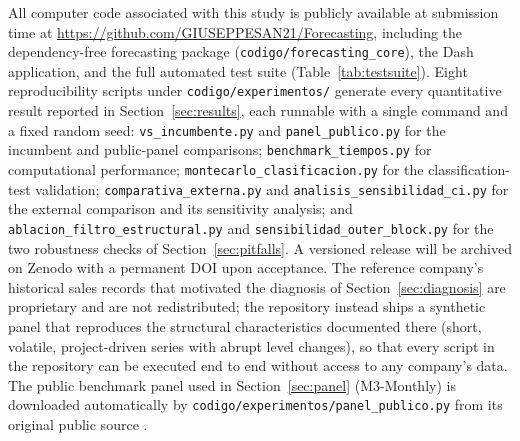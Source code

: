 \documentclass[forecasting,article,submit,pdftex,moreauthors]{Definitions/mdpi}
\begin{document}
All computer code associated with this study is publicly available at submission time at \url{https://github.com/GIUSEPPESAN21/Forecasting}, including the dependency-free forecasting package (\texttt{codigo/\allowbreak forecasting\_\allowbreak core}), the Dash application, and the full automated test suite (Table~\ref{tab:testsuite}). Eight reproducibility scripts under \texttt{codigo/\allowbreak experimentos/\allowbreak } generate every quantitative result reported in Section~\ref{sec:results}, each runnable with a single command and a fixed random seed: \texttt{vs\_\allowbreak incumbente.py} and \texttt{panel\_\allowbreak publico.py} for the incumbent and public-panel comparisons; \texttt{benchmark\_\allowbreak tiempos.py} for computational performance; \texttt{montecarlo\_\allowbreak clasificacion.py} for the classification-test validation; \texttt{comparativa\_\allowbreak externa.py} and \texttt{analisis\_\allowbreak sensibilidad\_\allowbreak ci.py} for the external comparison and its sensitivity analysis; and \texttt{ablacion\_\allowbreak filtro\_\allowbreak estructural.py} and \texttt{sensibilidad\_\allowbreak outer\_\allowbreak block.py} for the two robustness checks of Section~\ref{sec:pitfalls}. A versioned release will be archived on Zenodo with a permanent DOI upon acceptance. The reference company's historical sales records that motivated the diagnosis of Section~\ref{sec:diagnosis} are proprietary and are not redistributed; the repository instead ships a synthetic panel that reproduces the structural characteristics documented there (short, volatile, project-driven series with abrupt level changes), so that every script in the repository can be executed end to end without access to any company's data. The public benchmark panel used in Section~\ref{sec:panel} (M3-Monthly) is downloaded automatically by \texttt{codigo/\allowbreak experimentos/\allowbreak panel\_\allowbreak publico.py} from its original public source \cite{makridakis2020m3}.
\end{document}
